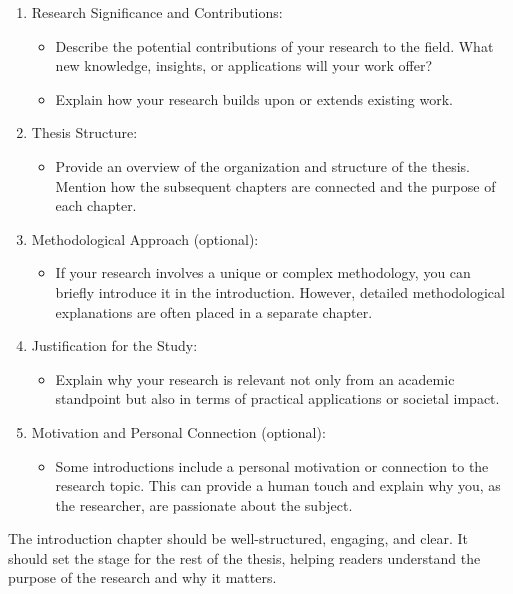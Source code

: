 \begin{enumerate}
\item Research Significance and Contributions:
	\begin{itemize}	
	\item Describe the potential contributions of your research to the field. What new knowledge, insights, or applications will your work offer?
	\item Explain how your research builds upon or extends existing work.
	   \end{itemize}

\item Thesis Structure:
	\begin{itemize}	
	\item Provide an overview of the organization and structure of the thesis. Mention how the subsequent chapters are connected and the purpose of each chapter.
	   \end{itemize}

\item Methodological Approach (optional):
	\begin{itemize}	
	\item If your research involves a unique or complex methodology, you can briefly introduce it in the introduction. However, detailed methodological explanations are often placed in a separate chapter.
	   \end{itemize}

\item Justification for the Study:
	\begin{itemize}	
	\item Explain why your research is relevant not only from an academic standpoint but also in terms of practical applications or societal impact.
	   \end{itemize}

\item Motivation and Personal Connection (optional):
	\begin{itemize}	
	\item Some introductions include a personal motivation or connection to the research topic. This can provide a human touch and explain why you, as the researcher, are passionate about the subject.
   \end{itemize}

\end{enumerate}

The introduction chapter should be well-structured, engaging, and clear. It should set the stage for the rest of the thesis, helping readers understand the purpose of the research and why it matters.

